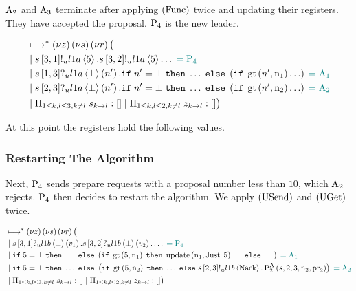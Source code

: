 $\operatorname{A_{2}}$ and $\operatorname{A_{3}}$ terminate after applying $\left(\operatorname{Func}\right)$ twice and updating their registers.
They have accepted the proposal.
$\operatorname{P_{4}}$ is the new leader.

\begin{align*}
&\longmapsto^*\left(\nu z\right)\left(\nu s\right)\left(\nu r\right)\big (\\
&\; | \;
s\left[3, 1\right]!_u l1a \left\langle 5 \right\rangle.
s\left[3, 2\right]!_u l1a \left\langle 5 \right\rangle\ldots
\;\textcolor{teal}{= \operatorname{P_{4}}}\\
&\; | \;
    s\left[1, 3\right]?_u l1a \left\langle \bot \right\rangle \left(n'\right).
    \mathtt{if}\; n' = \bot
    \;\mathtt{then}\; \ldots
    \;\mathtt{else}\; \left(
        \mathtt{if}\; \operatorname{gt}\left(n', \operatorname{n}_1\right)
        \ldots
    \right)
    \;\textcolor{teal}{= \operatorname{A_{1}}}\\
&\; | \;
    s\left[2, 3\right]?_u l1a \left\langle \bot \right\rangle \left(n'\right).
    \mathtt{if}\; n' = \bot
    \;\mathtt{then}\; \ldots
    \;\mathtt{else}\; \left(
        \mathtt{if}\; \operatorname{gt}\left(n', \operatorname{n}_2\right)
        \ldots
    \right)
    \;\textcolor{teal}{= \operatorname{A_{2}}}\\
&\; | \; \Pi_{1 \le k,l \le 3, k \neq l}\; s_{k\to l}:[]
\; | \; \Pi_{1 \le k,l \le 2, k \neq l}\; z_{k\to l}:[]
\big )
\end{align*}

At this point the registers hold the following values.


\subsubsection{Restarting The Algorithm}
Next, $\operatorname{P_{4}}$ sends prepare requests with a proposal number less than $10$, which $\operatorname{A_{2}}$ rejects.
$\operatorname{P_{4}}$ then decides to restart the algorithm.
We apply $\left(\operatorname{USend}\right)$ and $\left(\operatorname{UGet}\right)$ twice.

\begin{align*}
&\longmapsto^*\left(\nu z\right)\left(\nu s\right)\left(\nu r\right)\big (\\
&\; | \;
    s\left[3, 1\right]?_u l1b \left\langle \bot \right\rangle \left(v_1\right).
    s\left[3, 2\right]?_u l1b \left\langle \bot \right\rangle \left(v_2\right).
    \ldots
    \;\textcolor{teal}{= \operatorname{P_{4}}}\\
&\; | \;
    \mathtt{if}\; 5 = \bot
    \;\mathtt{then}\; \ldots
    \;\mathtt{else}\; \left(
        \mathtt{if}\; \operatorname{gt}\left(5, \operatorname{n}_1\right)
        \;\mathtt{then}\; \operatorname{update} \left(\operatorname{n}_1, \operatorname{Just}\; 5\right)\ldots
        \;\mathtt{else}\; \ldots
    \right)
    \;\textcolor{teal}{= \operatorname{A_{1}}}\\
&\; | \;
    \mathtt{if}\; 5 = \bot
    \;\mathtt{then}\; \ldots
    \;\mathtt{else}\; \left(
        \mathtt{if}\; \operatorname{gt}\left(5, \operatorname{n}_2\right)
        \;\mathtt{then}\; \ldots
        \;\mathtt{else}\;
            s\left[2, 3\right]!_u l1b \left\langle \operatorname{Nack} \right\rangle.
            \operatorname{P^{A}_{2}}\left(s, 2, 3, \operatorname{n}_2, \operatorname{pr}_2\right)
    \right)
    \;\textcolor{teal}{= \operatorname{A_{2}}}\\
&\; | \; \Pi_{1 \le k,l \le 3, k \neq l}\; s_{k\to l}:[]
\; | \; \Pi_{1 \le k,l \le 2, k \neq l}\; z_{k\to l}:[]
\big )
\end{align*}

